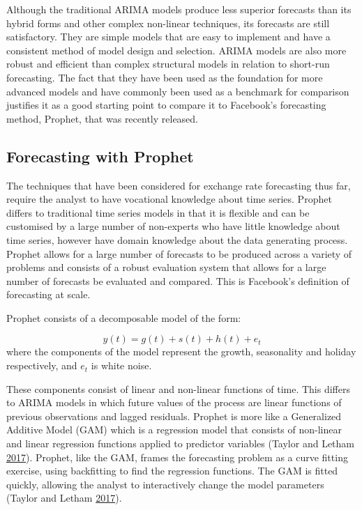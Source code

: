 \documentclass[12pt,preprint, authoryear]{elsarticle}
\numberwithin{equation}{section}
\numberwithin{figure}{section}
\numberwithin{table}{section}
\begin{document}
Although the traditional ARIMA models produce less superior forecasts
than its hybrid forms and other complex non-linear techniques, its
forecasts are still satisfactory. They are simple models that are easy
to implement and have a consistent method of model design and selection.
ARIMA models are also more robust and efficient than complex structural
models in relation to short-run forecasting. The fact that they have
been used as the foundation for more advanced models and have commonly
been used as a benchmark for comparison justifies it as a good starting
point to compare it to Facebook's forecasting method, Prophet, that was
recently released.

\subsection{Forecasting with Prophet}\label{forecasting-with-prophet}

The techniques that have been considered for exchange rate forecasting
thus far, require the analyst to have vocational knowledge about time
series. Prophet differs to traditional time series models in that it is
flexible and can be customised by a large number of non-experts who have
little knowledge about time series, however have domain knowledge about
the data generating process. Prophet allows for a large number of
forecasts to be produced across a variety of problems and consists of a
robust evaluation system that allows for a large number of forecasts be
evaluated and compared. This is Facebook's definition of forecasting at
scale.

Prophet consists of a decomposable model of the form:

\[ 
    y(t) = g(t) + s(t) + h(t) + e_t
\] where the components of the model represent the growth, seasonality
and holiday respectively, and \(e_t\) is white noise.

These components consist of linear and non-linear functions of time.
This differs to ARIMA models in which future values of the process are
linear functions of previous observations and lagged residuals. Prophet
is more like a Generalized Additive Model (GAM) which is a regression
model that consists of non-linear and linear regression functions
applied to predictor variables (Taylor and Letham
\protect\hyperlink{ref-taylor2017}{2017}). Prophet, like the GAM, frames
the forecasting problem as a curve fitting exercise, using backfitting
to find the regression functions. The GAM is fitted quickly, allowing
the analyst to interactively change the model parameters (Taylor and
Letham \protect\hyperlink{ref-taylor2017}{2017}).
\end{document}
